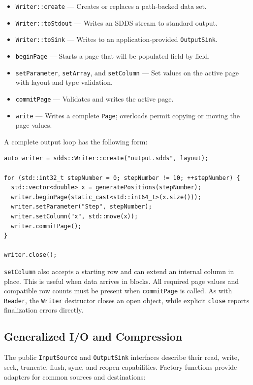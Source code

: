 \documentclass[11pt]{article}
\begin{document}
\begin{itemize}
\item {\tt Writer::create} --- Creates or replaces a path-backed data set.
\item {\tt Writer::toStdout} --- Writes an SDDS stream to standard output.
\item {\tt Writer::toSink} --- Writes to an application-provided
{\tt OutputSink}.
\item {\tt beginPage} --- Starts a page that will be populated field by field.
\item {\tt setParameter}, {\tt setArray}, and {\tt setColumn} --- Set values on
the active page with layout and type validation.
\item {\tt commitPage} --- Validates and writes the active page.
\item {\tt write} --- Writes a complete {\tt Page}; overloads permit copying or
moving the page values.
\end{itemize}

A complete output loop has the following form:

\begin{verbatim}
auto writer = sdds::Writer::create("output.sdds", layout);

for (std::int32_t stepNumber = 0; stepNumber != 10; ++stepNumber) {
  std::vector<double> x = generatePositions(stepNumber);
  writer.beginPage(static_cast<std::int64_t>(x.size()));
  writer.setParameter("Step", stepNumber);
  writer.setColumn("x", std::move(x));
  writer.commitPage();
}

writer.close();
\end{verbatim}

{\tt setColumn} also accepts a starting row and can extend an internal column
in place.  This is useful when data arrives in blocks.  All required page
values and compatible row counts must be present when {\tt commitPage} is
called.  As with {\tt Reader}, the {\tt Writer} destructor closes an open
object, while explicit {\tt close} reports finalization errors directly.

\subsection{Generalized I/O and Compression}

The public {\tt InputSource} and {\tt OutputSink} interfaces describe their
read, write, seek, truncate, flush, sync, and reopen capabilities.  Factory
functions provide adapters for common sources and destinations:
\end{document}
